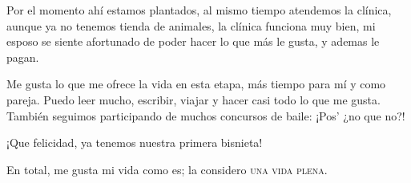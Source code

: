 \documentclass[letterpaper, 12pt]{book}
\begin{document}
Por el momento ahí estamos plantados, al mismo tiempo atendemos la clínica, aunque ya no tenemos tienda de animales, la clínica funciona muy bien, mi esposo se siente afortunado de poder hacer lo que más le gusta, y ademas le pagan.

Me gusta lo que me ofrece la vida en esta etapa, más tiempo para mí y como pareja. Puedo leer mucho, escribir, viajar y hacer casi todo lo que me gusta. También seguimos participando de muchos concursos de baile: ¡Pos' ¿no que no?!

¡Que felicidad, ya tenemos nuestra primera bisnieta!

En total, me gusta mi vida como es; la  considero \textsc{una vida plena}.
\end{document}
